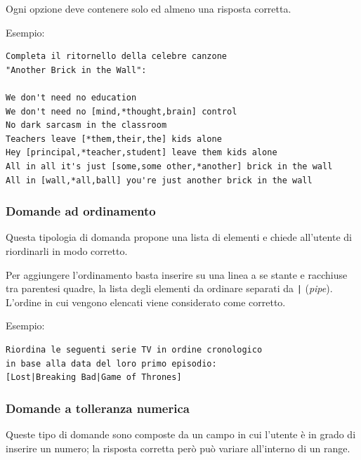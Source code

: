\documentclass[12pt,a4paper]{article}
\begin{document}
\par Ogni opzione deve contenere solo ed almeno una risposta corretta. \\

\par Esempio: \\
\begin{verbatim}
Completa il ritornello della celebre canzone 
"Another Brick in the Wall":

We don't need no education 
We don't need no [mind,*thought,brain] control 
No dark sarcasm in the classroom 
Teachers leave [*them,their,the] kids alone 
Hey [principal,*teacher,student] leave them kids alone 
All in all it's just [some,some other,*another] brick in the wall 
All in [wall,*all,ball] you're just another brick in the wall
\end{verbatim}

\subsubsection{Domande ad ordinamento}

\par Questa tipologia di domanda propone una lista di elementi e chiede all'utente di riordinarli in modo corretto. \\

\par Per aggiungere l'ordinamento basta inserire su una linea a se stante e racchiuse tra parentesi quadre, la lista degli elementi da ordinare separati da \texttt{|} (\textit{pipe}). L'ordine in cui vengono elencati viene considerato come corretto. \\

\par Esempio: \\
\begin{verbatim}
Riordina le seguenti serie TV in ordine cronologico 
in base alla data del loro primo episodio:
[Lost|Breaking Bad|Game of Thrones]
\end{verbatim}

\subsubsection{Domande a tolleranza numerica}

\par Queste tipo di domande sono composte da un campo in cui l'utente è in grado di inserire un numero; la risposta corretta però può variare all'interno di un range. \\
\end{document}
